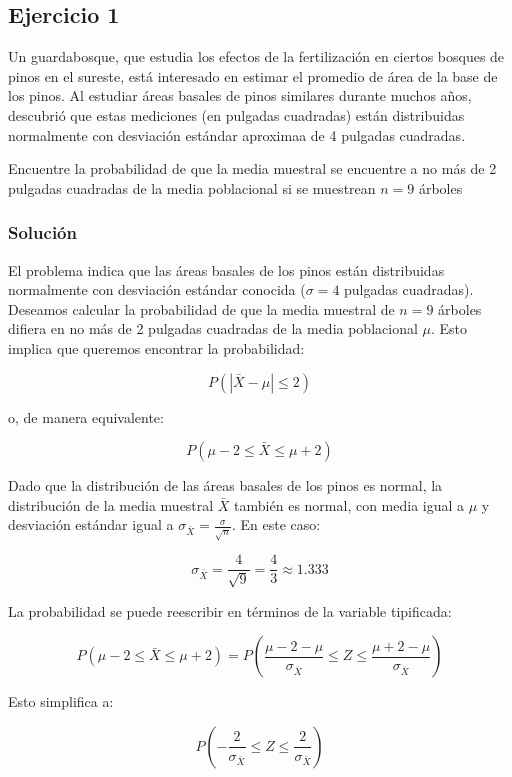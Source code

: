 \documentclass[
]{article}
\begin{document}
\subsection{Ejercicio 1}\label{ejercicio-1-1}

Un guardabosque, que estudia los efectos de la fertilización en ciertos bosques de pinos en el sureste, está interesado en estimar el promedio de área de la base de los pinos. Al estudiar áreas basales de pinos similares durante muchos años, descubrió que estas mediciones (en pulgadas cuadradas) están distribuidas normalmente con desviación estándar aproximaa de 4 pulgadas cuadradas.

Encuentre la probabilidad de que la media muestral se encuentre a no más de 2 pulgadas cuadradas de la media poblacional si se muestrean \(n=9\) árboles

\subsubsection{Solución}\label{soluciuxf3n-5}

El problema indica que las áreas basales de los pinos están distribuidas normalmente con desviación estándar conocida (\(\sigma=4\) pulgadas cuadradas). Deseamos calcular la probabilidad de que la media muestral de \(n=9\) árboles difiera en no más de 2 pulgadas cuadradas de la media poblacional \(\mu\). Esto implica que queremos encontrar la probabilidad:

\[
P(|\bar{X} - \mu| \leq 2)
\]

o, de manera equivalente:

\[
P(\mu - 2 \leq \bar{X} \leq \mu + 2)
\]

Dado que la distribución de las áreas basales de los pinos es normal, la distribución de la media muestral \(\bar{X}\) también es normal, con media igual a \(\mu\) y desviación estándar igual a \(\sigma_{\bar{X}} = \frac{\sigma}{\sqrt{n}}\). En este caso:

\[
\sigma_{\bar{X}} = \frac{4}{\sqrt{9}} = \frac{4}{3} \approx 1.333
\]

La probabilidad se puede reescribir en términos de la variable tipificada:

\[
P(\mu - 2 \leq \bar{X} \leq \mu + 2) = P\left(\frac{\mu - 2 - \mu}{\sigma_{\bar{X}}} \leq Z \leq \frac{\mu + 2 - \mu}{\sigma_{\bar{X}}}\right)
\]

Esto simplifica a:

\[
P\left(-\frac{2}{\sigma_{\bar{X}}} \leq Z \leq \frac{2}{\sigma_{\bar{X}}}\right)
\]
\end{document}
